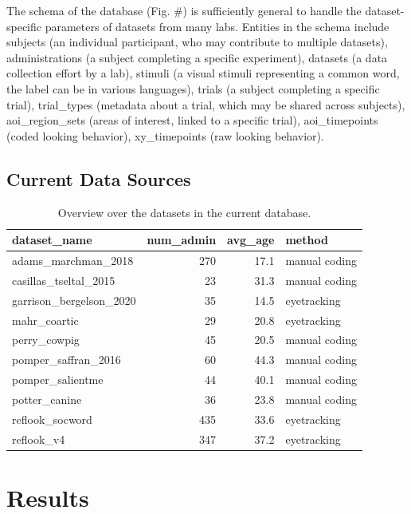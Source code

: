 \documentclass[10pt, letterpaper]{article}
\begin{document}
The schema of the database (Fig. \#) is sufficiently general to handle
the dataset-specific parameters of datasets from many labs. Entities in
the schema include subjects (an individual participant, who may
contribute to multiple datasets), administrations (a subject completing
a specific experiment), datasets (a data collection effort by a lab),
stimuli (a visual stimuli representing a common word, the label can be
in various languages), trials (a subject completing a specific trial),
trial\_types (metadata about a trial, which may be shared across
subjects), aoi\_region\_sets (areas of interest, linked to a specific
trial), aoi\_timepoints (coded looking behavior), xy\_timepoints (raw
looking behavior).

\hypertarget{current-data-sources}{%
\subsection{Current Data Sources}\label{current-data-sources}}

\begin{table}[H]
\centering
\begingroup\fontsize{9pt}{10pt}\selectfont
\begin{tabular}{lrrl}
  \hline
dataset\_name & num\_admin & avg\_age & method \\ 
  \hline
adams\_marchman\_2018 & 270 & 17.1 & manual coding \\ 
  casillas\_tseltal\_2015 & 23 & 31.3 & manual coding \\ 
  garrison\_bergelson\_2020 & 35 & 14.5 & eyetracking \\ 
  mahr\_coartic & 29 & 20.8 & eyetracking \\ 
  perry\_cowpig & 45 & 20.5 & manual coding \\ 
  pomper\_saffran\_2016 & 60 & 44.3 & manual coding \\ 
  pomper\_salientme & 44 & 40.1 & manual coding \\ 
  potter\_canine & 36 & 23.8 & manual coding \\ 
  reflook\_socword & 435 & 33.6 & eyetracking \\ 
  reflook\_v4 & 347 & 37.2 & eyetracking \\ 
   \hline
\end{tabular}
\endgroup
\caption{Overview over the datasets in the current database.} 
\end{table}

\hypertarget{results}{%
\section{Results}\label{results}}
\end{document}

